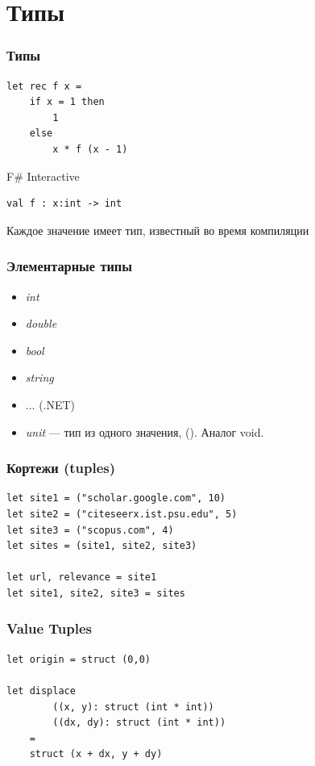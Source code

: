 \documentclass[xetex,mathserif,serif]{beamer}
\begin{document}
	\section{Типы}

	\begin{frame}[fragile]
		\frametitle{Типы}
		\begin{verbatim}
let rec f x =
    if x = 1 then 
        1 
    else 
        x * f (x - 1)
		\end{verbatim}

		\begin{alertblock}{F\# Interactive}
			\begin{verbatim}
val f : x:int -> int
			\end{verbatim}
		\end{alertblock}
		Каждое значение имеет тип, известный во время компиляции
\end{frame}

	\begin{frame}
		\frametitle{Элементарные типы}
		\begin{itemize}
			\item \textit{int}
			\item \textit{double}
			\item \textit{bool}
			\item \textit{string}
			\item ... (.NET)
			\item \textit{unit} --- тип из одного значения, (). Аналог void.
		\end{itemize}
	\end{frame}
	
	\begin{frame}[fragile]
		\frametitle{Кортежи (tuples)}
		\begin{verbatim}
let site1 = ("scholar.google.com", 10)
let site2 = ("citeseerx.ist.psu.edu", 5)
let site3 = ("scopus.com", 4)
let sites = (site1, site2, site3)

let url, relevance = site1
let site1, site2, site3 = sites
		\end{verbatim}
\end{frame}

	\begin{frame}[fragile]
		\frametitle{Value Tuples}
		\begin{verbatim}
let origin = struct (0,0)

let displace 
        ((x, y): struct (int * int))
        ((dx, dy): struct (int * int)) 
    =
    struct (x + dx, y + dy)
		\end{verbatim}
\end{frame}
\end{document}
